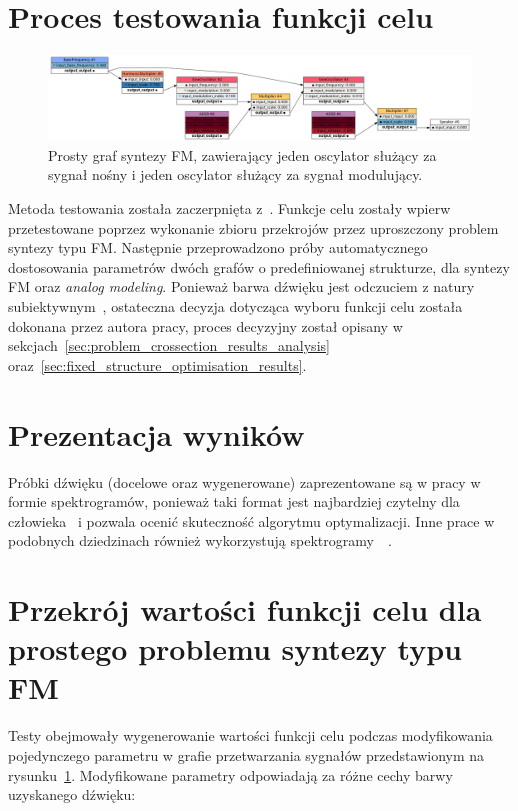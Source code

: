 \section{Proces testowania funkcji celu}

\begin{figure}\label{fig:fm_graph_for_benchmarks}
    \centering
    \includegraphics[angle=90,width=0.29\linewidth]{rys03/fm_graph_for_benchmarks.png}
    \caption{
      Prosty graf syntezy FM, zawierający jeden oscylator służący za sygnał nośny
      i jeden oscylator służący za sygnał modulujący.
    }
\end{figure}

Metoda testowania została zaczerpnięta z~\cite{evolutionary_puredata}.
Funkcje celu zostały wpierw przetestowane poprzez wykonanie
zbioru przekrojów przez uproszczony problem syntezy typu FM\@.
Następnie przeprowadzono próby automatycznego dostosowania parametrów dwóch grafów
o predefiniowanej strukturze, dla syntezy FM oraz \textit{analog modeling}.
Ponieważ barwa dźwięku jest odczuciem z natury subiektywnym~\cite{ji2020comprehensive},
ostateczna decyzja dotycząca wyboru funkcji celu została dokonana
przez autora pracy, proces decyzyjny został opisany w
sekcjach~\ref{sec:problem_crossection_results_analysis}
oraz~\ref{sec:fixed_structure_optimisation_results}.

\section{Prezentacja wyników}

Próbki dźwięku (docelowe oraz wygenerowane) zaprezentowane są w pracy w formie
spektrogramów, ponieważ taki format jest najbardziej czytelny dla
człowieka~\cite{computational_music_synthesis}
i pozwala ocenić skuteczność algorytmu optymalizacji.
Inne prace w podobnych dziedzinach również wykorzystują
spektrogramy~\cite{evolutionary_puredata}~\cite{engel2020ddsp}.

\section{Przekrój wartości funkcji celu dla prostego problemu syntezy typu FM}\label{sec:fm_synth_params_cross_section}

Testy obejmowały wygenerowanie wartości funkcji celu podczas
modyfikowania pojedynczego parametru w grafie przetwarzania sygnałów
przedstawionym na rysunku~\ref{fig:fm_graph_for_benchmarks}.
Modyfikowane parametry odpowiadają za różne cechy barwy uzyskanego dźwięku:

